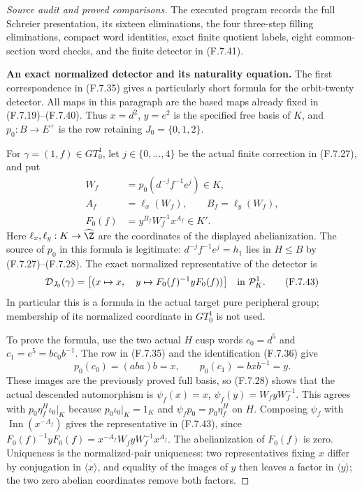 \begin{proof}[Source audit and proved comparisons]
The executed program
records the full Schreier presentation, its
sixteen eliminations, the four three-step filling
eliminations, compact word identities, exact
finite quotient labels, eight common-section
word checks, and the finite detector in (F.7.41).


\medskip\noindent\textbf{An exact normalized detector and its naturality equation.}
The first correspondence in (F.7.35) gives a particularly
short formula for the orbit-twenty detector.  All maps
in this paragraph are the based maps already fixed in
(F.7.19)--(F.7.40).  Thus $x=d^2$, $y=e^2$ is the
specified free basis of $K$, and $p_0:B\to E^+$ is the
row retaining $J_0=\{0,1,2\}$.

For $\gamma=(1,f)\in GT_0^1$, let $j\in\{0,\ldots,4\}$
be the actual finite correction in (F.7.27), and put
\[
 \begin{split}
 W_f&=p_0(d^{-j}f^{-1}e^j)\in K,\\
 A_f&=\ell_x(W_f),\qquad B_f=\ell_y(W_f),\\
 F_0(f)&=y^{B_f}W_f^{-1}x^{A_f}\in K'.
 \end{split}                                                   \tag{F.7.42}
\]
Here $\ell_x,\ell_y:K\to\widehat\Z$ are the
coordinates of the displayed abelianization.
The source of $p_0$ in this formula is legitimate:
$d^{-j}f^{-1}e^j=h_1$ lies in $H\leq B$ by
(F.7.27)--(F.7.28).
The exact normalized representative of the detector is
\[
 \mathcal D_{J_0}(\gamma)
       =\bigl[(x\mapsto x,\quad
                   y\mapsto F_0(f)^{-1}yF_0(f))\bigr]
                    \quad\hbox{in }\mathcal P_K^1.              \tag{F.7.43}
\]
In particular this is a formula in the actual target
pure peripheral group; membership of its normalized
coordinate in $GT_0^1$ is not used.

To prove the formula, use the two actual $H$ cusp
words $c_0=d^5$ and $c_1=e^5=b c_0b^{-1}$.
The row in (F.7.35) and the identification (F.7.36)
give
\[
       p_0(c_0)=(aba)b=x,\qquad
       p_0(c_1)=bxb^{-1}=y .
\]
These images are the previously proved full basis,
so (F.7.28) shows that the actual descended
automorphism is
$\psi_f(x)=x$, $\psi_f(y)=W_fyW_f^{-1}$.
This agrees with $p_0\eta_f^H\iota_0|_K$ because
$p_0\iota_0|_K=1_K$ and $\psi_fp_0=p_0\eta_f^H$
on $H$.  Composing $\psi_f$ with
$\operatorname{Inn}(x^{-A_f})$ gives the representative
in (F.7.43), since
$F_0(f)^{-1}yF_0(f)=
x^{-A_f}W_fyW_f^{-1}x^{A_f}$.
The abelianization of $F_0(f)$ is zero.
Uniqueness is the normalized-pair uniqueness:
two representatives fixing $x$ differ by conjugation
in $\overline{\langle x\rangle}$, and equality of the
images of $y$ then leaves a factor in
$\overline{\langle y\rangle}$; the two zero
abelian coordinates remove both factors.


\end{proof}

